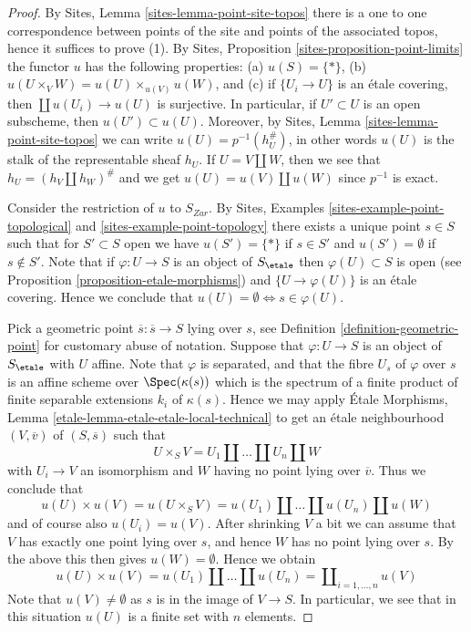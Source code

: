 \begin{proof}
By
Sites, Lemma \ref{sites-lemma-point-site-topos}
there is a one to one correspondence between points of the site and points
of the associated topos, hence it suffices to prove (1).
By
Sites, Proposition \ref{sites-proposition-point-limits}
the functor $u$ has the following properties:
(a) $u(S) = \{*\}$, (b) $u(U \times_V W) = u(U) \times_{u(V)} u(W)$, and
(c) if $\{U_i \to U\}$ is an \'etale covering, then
$\coprod u(U_i) \to u(U)$ is surjective.
In particular, if $U' \subset U$ is an open subscheme,
then $u(U') \subset u(U)$. Moreover, by
Sites, Lemma \ref{sites-lemma-point-site-topos}
we can write $u(U) = p^{-1}(h_U^\#)$, in other words $u(U)$ is the
stalk of the representable sheaf $h_U$. If
$U = V \amalg W$, then we see that $h_U = (h_V \amalg h_W)^\#$ and we get
$u(U) = u(V) \amalg u(W)$ since $p^{-1}$ is exact.

\medskip\noindent
Consider the restriction of $u$ to $S_{Zar}$. By
Sites, Examples \ref{sites-example-point-topological} and
\ref{sites-example-point-topology}
there exists a unique point $s \in S$ such that for $S' \subset S$ open we
have $u(S') = \{*\}$ if $s \in S'$ and $u(S') = \emptyset$ if $s \not \in S'$.
Note that if $\varphi : U \to S$ is an object of $S_\etale$ then
$\varphi(U) \subset S$ is open (see
Proposition \ref{proposition-etale-morphisms})
and $\{U \to \varphi(U)\}$ is an \'etale covering. Hence we conclude that
$u(U) = \emptyset \Leftrightarrow s \in \varphi(U)$.

\medskip\noindent
Pick a geometric point $\overline{s} : \overline{s} \to S$ lying over $s$, see
Definition \ref{definition-geometric-point}
for customary abuse of notation. Suppose that $\varphi : U \to S$ is an object
of $S_\etale$ with $U$ affine. Note that $\varphi$ is separated, and
that the fibre $U_s$ of $\varphi$ over $s$ is an affine scheme over
$\Spec(\kappa(s))$ which is the spectrum of a finite product of
finite separable extensions $k_i$ of $\kappa(s)$. Hence we may apply
\'Etale Morphisms, Lemma \ref{etale-lemma-etale-etale-local-technical}
to get an \'etale neighbourhood $(V, \overline{v})$ of $(S, \overline{s})$
such that
$$
U \times_S V = U_1 \amalg \ldots \amalg U_n \amalg W
$$
with $U_i \to V$ an isomorphism and $W$ having no point lying over
$\overline{v}$. Thus we conclude that
$$
u(U) \times u(V) =
u(U \times_S V) =
u(U_1) \amalg \ldots \amalg u(U_n) \amalg u(W)
$$
and of course also $u(U_i) = u(V)$. After shrinking $V$ a bit we can
assume that $V$ has exactly one point lying over $s$, and hence $W$ has no
point lying over $s$. By the above this then gives $u(W) = \emptyset$.
Hence we obtain
$$
u(U) \times u(V) =
u(U_1) \amalg \ldots \amalg u(U_n) =
\coprod\nolimits_{i = 1, \ldots, n} u(V)
$$
Note that $u(V) \not = \emptyset$ as $s$ is in the image of $V \to S$.
In particular, we see that in this situation $u(U)$ is a finite
set with $n$ elements.


\end{proof}
